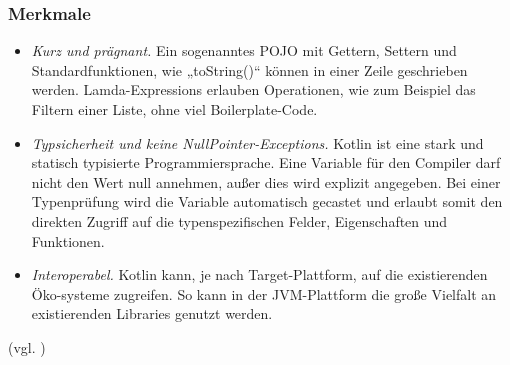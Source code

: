 \subsubsection{Merkmale}
\begin{itemize}
  \item \textit{Kurz und prägnant.} Ein sogenanntes POJO mit Gettern, Settern und Standardfunktionen, wie „toString()“ können in einer Zeile geschrieben werden. Lamda-Expressions erlauben Operationen, wie zum Beispiel das Filtern einer Liste, ohne viel Boilerplate-Code. 
  \item  \textit{Typsicherheit und keine NullPointer-Exceptions.} Kotlin ist eine stark und statisch typisierte Programmiersprache. Eine Variable für den Compiler darf nicht den Wert null annehmen, außer dies wird explizit angegeben. Bei einer Typenprüfung wird die Variable automatisch gecastet und erlaubt somit den direkten Zugriff auf die typenspezifischen Felder, Eigenschaften und Funktionen.
  \item  \textit{Interoperabel.} Kotlin kann, je nach Target-Plattform, auf die existierenden Öko-systeme zugreifen. So kann in der JVM-Plattform die große Vielfalt an existierenden Libraries genutzt werden.
\end{itemize}
(vgl. \cite{Kotlin-Lang})
